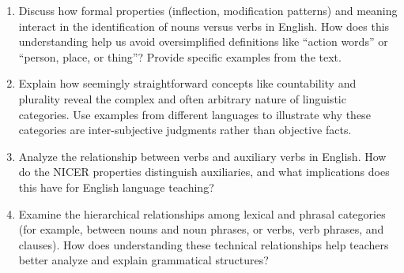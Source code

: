 \begin{tcolorbox}[title=Essay Questions, colback=white, colframe=black, coltitle=black, fonttitle=\bfseries, colbacktitle=gray!10!white]

\begin{enumerate}[noitemsep]
    \item Discuss how formal properties (inflection, modification patterns) and meaning interact in the identification of nouns versus verbs in English. How does this understanding help us avoid oversimplified definitions like ``action words'' or ``person, place, or thing''? Provide specific examples from the text.
    
    \item Explain how seemingly straightforward concepts like countability and plurality reveal the complex and often arbitrary nature of linguistic categories. Use examples from different languages to illustrate why these categories are inter-subjective judgments rather than objective facts.
    
    \item Analyze the relationship between verbs and auxiliary verbs in English. How do the NICER properties distinguish auxiliaries, and what implications does this have for English language teaching?
    
    \item Examine the hierarchical relationships among lexical and phrasal categories (for example, between nouns and noun phrases, or verbs, verb phrases, and clauses). How does understanding these technical relationships help teachers better analyze and explain grammatical structures?
\end{enumerate}

\end{tcolorbox}
